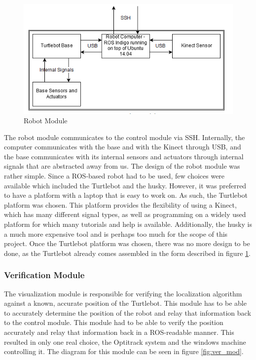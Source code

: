 \documentclass{article}
\newcommand\tab[1][0.5cm]{\hspace*{#1}}
\newcounter{subsubsubsection}[subsubsection]
\begin{document}
\begin{figure}[h!]
\centering
\includegraphics[scale=0.70]{robot_module.PNG}
\caption{Robot Module}
\label{fig:rob_mod}
\end{figure}

The robot module communicates to the control module via SSH. Internally, the computer communicates with the base and with the Kinect through USB, and the base communicates with its internal sensors and actuators through internal signals that are abstracted away from us.
\tab The design of the robot module was rather simple. Since a ROS-based robot had to be used, few choices were available which included the Turtlebot and the husky. However, it was preferred to have a platform with a laptop that is easy to work on. As such, the Turtlebot platform was chosen. This platform provides the flexibility of using a Kinect, which has many different signal types, as well as programming on a widely used platform for which many tutorials and help is available. Additionally, the husky is a much more expensive tool and is perhaps too much for the scope of this project. Once the Turtlebot platform was chosen, there was no more design to be done, as the Turtlebot already comes assembled in the form described in figure \ref{fig:rob_mod}.

\subsubsection{Verification Module}
\tab The visualization module is responsible for verifying the localization algorithm against a known, accurate position of the Turtlebot. This module has to be able to accurately determine the position of the robot and relay that information back to the control module. This module had to be able to verify the position accurately and relay that information back in a ROS-readable manner. This resulted in only one real choice, the Optitrack system and the windows machine controlling it. The diagram for this module can be seen in figure \ref{fig:ver_mod}.\\
\end{document}
